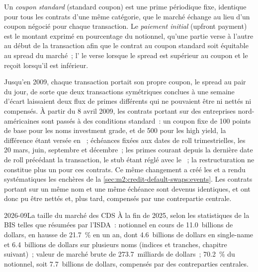 \begin{definition}\label{def:m2:credit-default-swaps:std}
Un \emph{coupon standard} (standard coupon) est une prime périodique fixe, identique
pour tous les contrats d'une même catégorie, que le marché échange au lieu d'un coupon négocié
pour chaque transaction. Le \emph{paiement initial} (upfront payment) est le montant
exprimé en pourcentage du notionnel, qu'une partie verse à l'autre au début de la transaction afin que le
contrat au coupon standard soit équitable au spread du marché~; l'
le verse lorsque le spread est supérieur au coupon et le reçoit lorsqu'il est inférieur.
\end{definition}

Jusqu'en 2009, chaque transaction portait son propre coupon, le spread au pair du jour, de sorte que deux
transactions symétriques conclues à une semaine d'écart laissaient deux flux de primes différents qui
ne pouvaient être ni nettés ni compensés. À partir du 8 avril 2009, les contrats portant sur des entreprises nord-américaines
sont passés à des conditions standard~: un coupon fixe de 100 points de base pour les noms
investment grade, et de 500 pour les high yield, la différence étant versée en ~;
échéances fixées aux dates de roll trimestrielles, les 20 mars, juin, septembre et décembre~;
les primes courant depuis la dernière date de roll précédant la transaction, le stub étant réglé avec le
~; la restructuration ne constitue plus un  pour ces contrats. Ce même changement a créé
les  et a rendu systématiques les enchères de la \cref{sec:m2:credit-default-swaps:events}.
Les contrats portant sur un même nom et une même échéance sont devenus identiques, et ont donc pu être nettés
et, plus tard, compensés par une contrepartie centrale.

\begin{dated}{2026-09}{La taille du marché des CDS}\label{dat:m2:credit-default-swaps:size}
À la fin de 2025, selon les statistiques de la BIS telles que résumées par l'ISDA~: notionnel en cours
de 11.0~billions de dollars, en hausse de 21.7~\% en un an, dont 4.6~billions de dollars en single-name et
6.4~billions de dollars sur plusieurs noms (indices et tranches, chapitre suivant)~; valeur de marché brute
de 273.7~milliards de dollars~; 70.2~\% du notionnel, soit 7.7~billions de dollars, compensés par
des contreparties centrales.
\end{dated}


